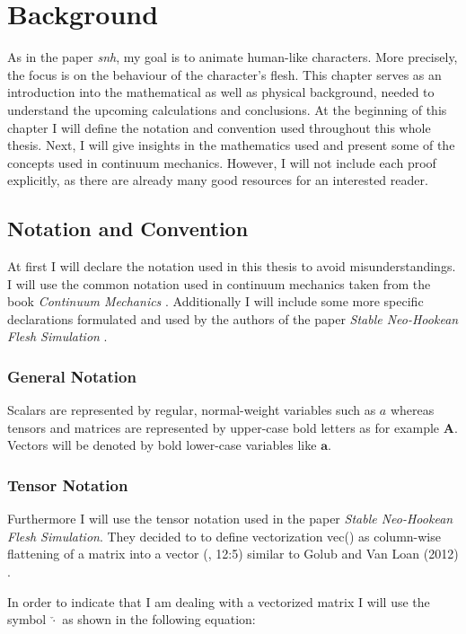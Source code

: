 \chapter{Background} \label{c:Background}
As in the paper \textit{\acrshort{snh}}, my goal is to animate human-like characters. More precisely, the focus is on the behaviour of the character's flesh. This chapter serves as an introduction into the mathematical as well as physical background, needed to understand the upcoming calculations and conclusions. At the beginning of this chapter I will define the notation and convention used throughout this whole thesis. Next, I will give insights in the mathematics used and present some of the concepts used in continuum mechanics. However, I will not include each proof explicitly, as there are already many good resources for an interested reader.

\section{Notation and Convention}
At first I will declare the notation used in this thesis to avoid misunderstandings. I will use the common notation used in continuum mechanics taken from the book \textit{Continuum Mechanics} \cite{Spencer1980}. Additionally I will include some more specific declarations formulated and used by the authors of the paper \textit{Stable Neo-Hookean Flesh Simulation} \cite{Smith:2018:SNF:3191713.3180491}. 


\subsection{General Notation}
Scalars are represented by regular, normal-weight variables such as $a$ whereas 
tensors and matrices are represented by upper-case bold letters as for example $\textbf{A}$. Vectors will be denoted by bold lower-case variables like $\textbf{a}$. 


\subsection{Tensor Notation}
Furthermore I will use the tensor notation used in the paper \textit{Stable Neo-Hookean Flesh Simulation}. They decided to to define vectorization vec(\cdot) as column-wise flattening of a matrix into a vector (\cite{Smith:2018:SNF:3191713.3180491}, 12:5) similar to Golub and Van Loan (2012) \cite{golub2012matrix}.

In order to indicate that I am dealing with a vectorized matrix I will use the symbol $\check{\cdot}$ as shown in the following equation:


